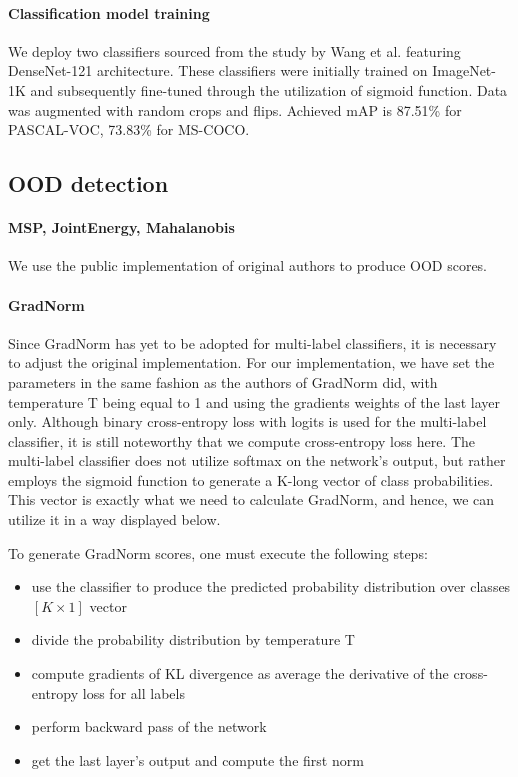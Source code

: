\paragraph{Classification model training}
We deploy two classifiers sourced from the study by Wang et al.\cite{Wang2021} featuring DenseNet-121 architecture. 
These classifiers were initially trained on ImageNet-1K and subsequently fine-tuned through the utilization of sigmoid function.
Data was augmented with random crops and flips. 
Achieved mAP is 87.51\% for PASCAL-VOC, 73.83\% for MS-COCO. 

\subsection{OOD detection}
\paragraph{MSP, JointEnergy, Mahalanobis}
We use the public implementation of original authors to produce OOD scores. 

\paragraph{GradNorm}
Since GradNorm has yet to be adopted for multi-label classifiers, it is necessary to adjust the original implementation. 
For our implementation, we have set the parameters in the same fashion as the authors of GradNorm did, with temperature T being equal to 1 and using the gradients weights of the last layer only. 
Although binary cross-entropy loss with logits is used for the multi-label classifier, it is still noteworthy that we compute cross-entropy loss here. 
The multi-label classifier does not utilize softmax on the network's output, but rather employs the sigmoid function to generate a K-long vector of class probabilities. 
This vector is exactly what we need to calculate GradNorm, and hence, we can utilize it in a way displayed below.

\noindent To generate GradNorm scores, one must execute the following steps:
\begin{itemize}
    \itemsep0em 
    \item use the classifier to produce the predicted probability distribution over classes $[K \times 1]$ vector
    \item divide the probability distribution by temperature T
    \item compute gradients of KL divergence as average the derivative of the cross-entropy loss for all labels
    \item perform backward pass of the network
    \item get the last layer's output and compute the first norm
\end{itemize}

